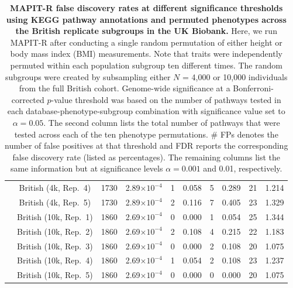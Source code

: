\documentclass[10pt]{article}
\begin{document}
\begin{landscape}
\begin{table}[ht]
\begin{tabular}{|c|c|c|ccc|cc|cc|}
  & British (4k, Rep.~4) & 1730 & 2.89$\times 10^{-4}$ & 1 & 0.058 & 5 & 0.289 & 21 & 1.214 \\
  & British (4k, Rep.~5) & 1730 & 2.89$\times 10^{-4}$ & 2 & 0.116 & 7 & 0.405 & 23 & 1.329 \\
  & British (10k, Rep.~1) & 1860 & 2.69$\times 10^{-4}$ & 0 & 0.000 & 1 & 0.054 & 25 & 1.344 \\
  & British (10k, Rep.~2) & 1860 & 2.69$\times 10^{-4}$ & 2 & 0.108 & 4 & 0.215 & 22 & 1.183 \\
  & British (10k, Rep.~3) & 1860 & 2.69$\times 10^{-4}$ & 0 & 0.000 & 2 & 0.108 & 20 & 1.075 \\
  & British (10k, Rep.~4) & 1860 & 2.69$\times 10^{-4}$ & 1 & 0.054 & 2 & 0.108 & 23 & 1.237 \\
  & British (10k, Rep.~5) & 1860 & 2.69$\times 10^{-4}$ & 0 & 0.000 & 0 & 0.000 & 20 & 1.075 \\ 
   \hline
\end{tabular}
\caption{\textbf{MAPIT-R false discovery rates at different significance thresholds using KEGG pathway annotations and permuted phenotypes across the British replicate subgroups in the UK Biobank.} Here, we run MAPIT-R after conducting a single random permutation of either height or body mass index (BMI) measurements. Note that traits were independently permuted within each population subgroup ten different times. The random subgroups were created by subsampling either $N$ = 4,000 or 10,000 individuals from the full British cohort. Genome-wide significance at a Bonferroni-corrected $p$-value threshold was based on the number of pathways tested in each database-phenotype-subgroup combination with significance value set to $\alpha = 0.05$. The second column lists the total number of pathways that were tested across each of the ten phenotype permutations. \# FPs denotes the number of false positives at that threshold and FDR reports the corresponding false discovery rate (listed as percentages). The remaining columns list the same information but at significance levels $\alpha = 0.001$ and 0.01, respectively.}
\label{InterPath-Supp-Table-BritReps-FDRs-pt1}
\end{table}
\end{landscape}

\end{document}
